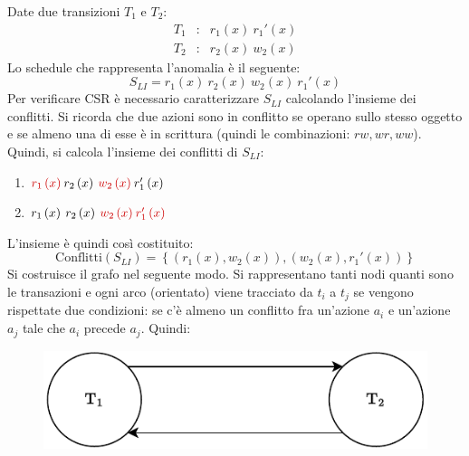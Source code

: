 \documentclass[a4paper]{article}
\begin{document}
	Date due transizioni $T_{1}$ e $T_{2}$:
	\begin{equation*}
		\begin{array}{lll}
			T_{1} &:& r_{1}\left(x\right) \: r_{1}'\left(x\right) \\
			T_{2} &:& r_{2}\left(x\right) \: w_{2}\left(x\right)
		\end{array}
	\end{equation*}
	Lo schedule che rappresenta l'anomalia è il seguente:
	\begin{equation*}
		S_{LI} = r_{1}\left(x\right) \: r_{2}\left(x\right) \: w_{2}\left(x\right) \: r_{1}'\left(x\right)
	\end{equation*}
	Per verificare CSR è necessario caratterizzare $S_{LI}$ calcolando l'insieme dei conflitti. Si ricorda che due azioni sono in conflitto se operano sullo stesso oggetto e se almeno una di esse è in scrittura (quindi le combinazioni: $rw, wr, ww$). Quindi, si calcola l'insieme dei conflitti di $S_{LI}$:
	\begin{enumerate}
		\item $\textcolor{Red3}{r_{1}\left(x\right)} \: r_{2}\left(x\right) \: \textcolor{Red3}{w_{2}\left(x\right)} \: r_{1}'\left(x\right)$
		
		\item $r_{1}\left(x\right) \: r_{2}\left(x\right) \: \textcolor{Red3}{w_{2}\left(x\right)} \: \textcolor{Red3}{r_{1}'\left(x\right)}$
	\end{enumerate}
	L'insieme è quindi così costituito:
	\begin{equation*}
		\text{Conflitti}\left(S_{LI}\right) = \left\{\left(r_{1}\left(x\right), w_{2}\left(x\right)\right), \left(w_{2}\left(x\right), r_{1}'\left(x\right)\right)\right\}
	\end{equation*}
	Si costruisce il grafo nel seguente modo. Si rappresentano tanti nodi quanti sono le transazioni e ogni arco (orientato) viene tracciato da $t_{i}$ a $t_{j}$ se vengono rispettate due condizioni: se c'è almeno un conflitto fra un'azione $a_{i}$ e un'azione $a_{j}$ tale che $a_{i}$ precede $a_{j}$. Quindi:
	\begin{figure}[!htp]
		\centering
		\includegraphics[width=.55\textwidth]{img/CSR-1.pdf}
	\end{figure}
	
\end{document}
